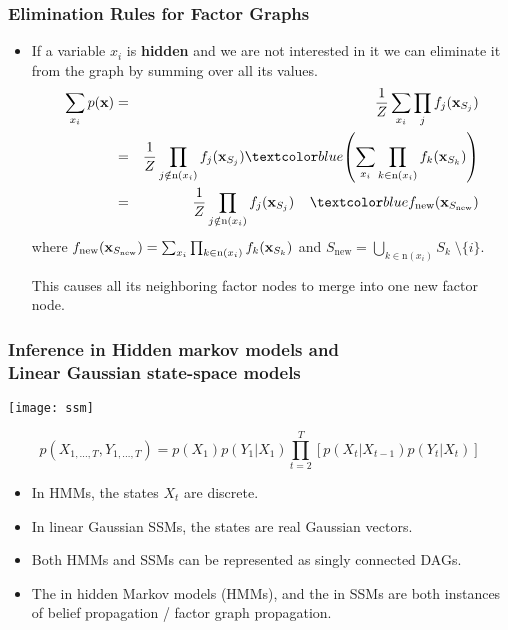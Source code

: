 \begin{frame}
\frametitle{Elimination Rules for Factor Graphs}

\vspace*{-2ex}
\begin{itemize}
\item {}

If a variable $x_i$ is {\bf hidden} and we are not interested in it we
can eliminate it from the graph by summing over all its values. \\
\begin{eqnarray*}
\sum_{x_i} p(\bfx) & = & \frac{1}{Z} \sum_{x_i} \prod_{j}
f_j(\bfx_{S_j}) \\
&=& \frac{1}{Z} \prod_{j \notin {\mathrm n}(x_i)} 
f_j(\bfx_{S_j}) \Blue{
\left( \sum_{x_i} \prod_{k \in {\mathrm n}(x_i)}  f_k(\bfx_{S_k})
\right)}\\
&=& \frac{1}{Z} \prod_{j \notin {\mathrm n}(x_i)} 
f_j(\bfx_{S_j}) \;\; \; \; \Blue{f_{\mathrm{new}}(\bfx_{S_{\mathrm{new}}})}
\end{eqnarray*}
where $
f_{\mathrm{new}}(\mathbf x_{S_{\mathrm{new}}}) = \sum_{x_i} \prod_{k \in
  {\mathrm n}(x_i)}  f_k(\mathbf x_{S_k})
$
and $\displaystyle S_{\mathrm{new}} = \bigcup_{k \in {\mathrm n}(x_i)}
\!\! S_k \; \setminus \{i\}$. 

This causes all its neighboring factor nodes to merge into one new
factor node.
\end{itemize}
\end{frame}
\begin{frame}
\frametitle{Inference in Hidden markov models and \\
Linear Gaussian state-space models}

\centerline{\texttt{[image: ssm]}}

\[
p(X_{1, \ldots, T}, Y_{1, \ldots, T}) = p(X_1) p(Y_1|X_1) \prod_{t=2}^T
\left[ p(X_t|X_{t-1}) p(Y_t|X_t) \right] 
\]
\begin{itemize}
\item In HMMs, the states $X_t$ are discrete.
\item In linear Gaussian SSMs, the states are real Gaussian vectors.
\item Both HMMs and SSMs can be represented as singly connected DAGs.
\item The  in hidden Markov models (HMMs),
  and the  in SSMs are both instances
  of belief propagation / factor graph propagation. 
\end{itemize}

\end{frame}

